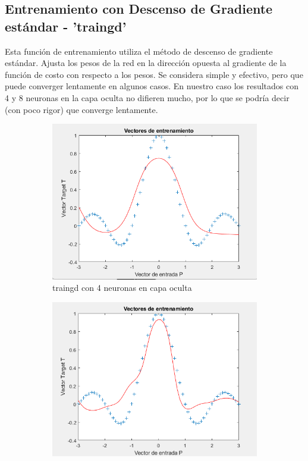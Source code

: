 \documentclass[a4paper, 12pt]{article}
\begin{document}
            
            \subsection{Entrenamiento con Descenso de Gradiente estándar - 'traingd'}
                Esta función de entrenamiento utiliza el método de descenso de gradiente estándar. Ajusta los pesos de la red en la dirección opuesta al gradiente de la función de costo con respecto a los pesos. Se considera simple y efectivo, pero que puede converger lentamente en algunos casos. En nuestro caso los resultados con 4 y 8 neuronas en la capa oculta no difieren mucho, por lo que se podría decir (con poco rigor) que converge lentamente.

                \begin{figure}[htp!]
                    \caption{Descenso gradiente estándar}
                    \begin{subfigure}{0.49\textwidth}
                        \centering
        		      \includegraphics[width=\textwidth]{figures/parte1/Ej2/Ej2_fig1_traingd.png}
                        \caption{traingd con 4 neuronas en capa oculta}
                    \end{subfigure}
                    \begin{subfigure}{0.49\textwidth}
                        \includegraphics[width=\textwidth]{figures/parte1/Ej2/Ej2_fig5_traingd_8neuronas.png}

\end{subfigure}
\end{figure}
\end{document}
